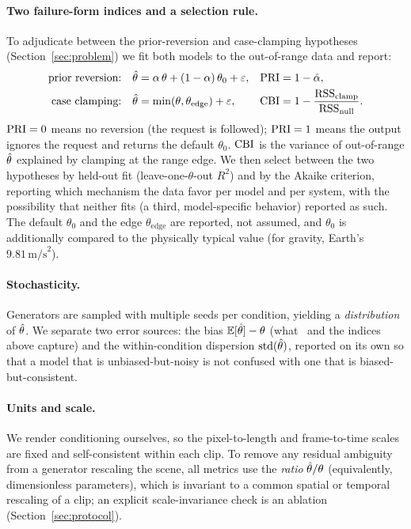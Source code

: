 \documentclass[10pt,twocolumn,letterpaper]{article}
\begin{document}
\paragraph{Two failure-form indices and a selection rule.}
To adjudicate between the prior-reversion and case-clamping hypotheses
(Section~\ref{sec:problem}) we fit both models to the
out-of-range data and report:
\begin{align}
\text{prior reversion:}\quad & \hat{\theta} = \alpha\,\theta + (1-\alpha)\,\theta_0 + \varepsilon,
   & \mathrm{PRI} &= 1-\hat\alpha, \label{eq:pri}\\
\text{case clamping:}\quad & \hat{\theta} = \min(\theta,\theta_{\text{edge}}) + \varepsilon,
   & \mathrm{CBI} &= 1 - \frac{\mathrm{RSS}_{\text{clamp}}}{\mathrm{RSS}_{\text{null}}}. \nonumber
\end{align}
$\mathrm{PRI}=0$ means no reversion (the request is followed); $\mathrm{PRI}=1$ means the
output ignores the request and returns the default $\theta_0$. $\mathrm{CBI}$ is the
variance of out-of-range $\hat{\theta}$ explained by clamping at the range edge.
We then select between the two hypotheses by held-out fit (leave-one-$\theta$-out $R^2$)
and by the Akaike criterion, reporting which mechanism the data favor per model
and per system, with the possibility that neither fits (a third, model-specific
behavior) reported as such. The default $\theta_0$ and the edge
$\theta_{\text{edge}}$ are reported, not assumed, and $\theta_0$ is additionally
compared to the physically typical value (for gravity, Earth's
$9.81\,\text{m/s}^2$).

\paragraph{Stochasticity.}
Generators are sampled with multiple seeds per condition, yielding a
\emph{distribution} of $\hat{\theta}$. We separate two error sources: the bias
$\mathbb{E}[\hat{\theta}]-\theta$ (what \PRE\ and the indices above capture) and the
within-condition dispersion $\mathrm{std}(\hat{\theta})$, reported on its own so that
a model that is unbiased-but-noisy is not confused with one that is
biased-but-consistent.

\paragraph{Units and scale.}
We render conditioning ourselves, so the pixel-to-length and frame-to-time
scales are fixed and self-consistent within each clip. To remove any residual
ambiguity from a generator rescaling the scene, all metrics use the
\emph{ratio} $\hat{\theta}/\theta$ (equivalently, dimensionless parameters), which is
invariant to a common spatial or temporal rescaling of a clip; an explicit
scale-invariance check is an ablation (Section~\ref{sec:protocol}).
\end{document}
